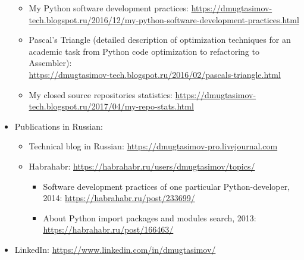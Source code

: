 \documentclass[a4paper,8pt]{extarticle}
\begin{document}
\begin{itemize}
        \begin{itemize}
            \setlength{\itemsep}{2pt}
            \item My Python software development practices: \url{https://dmugtasimov-tech.blogspot.ru/2016/12/my-python-software-development-practices.html}
            \item Pascal’s Triangle (detailed description of optimization techniques for an academic task from Python code optimization to refactoring to Assembler):\\
            \url{https://dmugtasimov-tech.blogspot.ru/2016/02/pascals-triangle.html}
            \item My closed source repositories statistics: \url{https://dmugtasimov-tech.blogspot.ru/2017/04/my-repo-stats.html}
        \end{itemize}
    \item Publications in Russian:
        \vspace{2pt}  %
        \begin{itemize}
            \item Technical blog in Russian: \url{https://dmugtasimov-pro.livejournal.com}
            \item Habrahabr: \url{https://habrahabr.ru/users/dmugtasimov/topics/}
            \begin{itemize}
                \item Software development practices of one particular Python-developer, 2014: \url{https://habrahabr.ru/post/233699/}
                \item About Python import packages and modules search, 2013: \url{https://habrahabr.ru/post/166463/}
            \end{itemize}
        \end{itemize}
    \item LinkedIn: \url{https://www.linkedin.com/in/dmugtasimov/}
\end{itemize}
\end{document}
